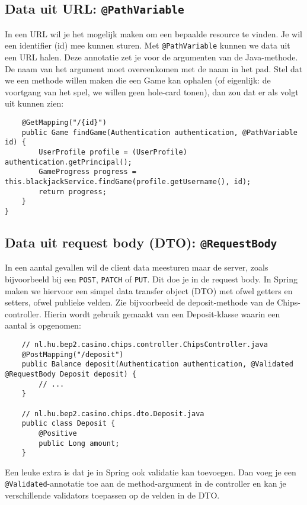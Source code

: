 \subsection{Data uit URL: \texttt{@PathVariable}}
In een URL wil je het mogelijk maken om een bepaalde resource te vinden. 
Je wil een identifier (id) mee kunnen sturen.
Met \texttt{@PathVariable} kunnen we data uit een URL halen. Deze annotatie zet je voor 
de argumenten van de Java-methode. De naam van het argument moet overeenkomen met de naam 
in het pad. Stel dat we een methode willen 
maken die een Game kan ophalen 
(of eigenlijk: de voortgang van het spel, we willen geen hole-card tonen), 
dan zou dat er als volgt uit kunnen zien:
\begin{verbatim}
    @GetMapping("/{id}")
    public Game findGame(Authentication authentication, @PathVariable id) {
        UserProfile profile = (UserProfile) authentication.getPrincipal();
        GameProgress progress = this.blackjackService.findGame(profile.getUsername(), id);
        return progress;
    }
}
\end{verbatim}

\subsection{Data uit request body (DTO): \texttt{@RequestBody}}
In een aantal gevallen wil de client data meesturen maar de server, zoals 
bijvoorbeeld bij een \texttt{POST}, \texttt{PATCH} of \texttt{PUT}. 
Dit doe je in de request body. In Spring maken we hiervoor een simpel
data transfer object (DTO) met ofwel getters en setters, ofwel publieke velden. 
Zie bijvoorbeeld de deposit-methode van de Chips-controller.
Hierin wordt gebruik gemaakt van een Deposit-klasse waarin een aantal is
opgenomen:

\begin{verbatim}
    // nl.hu.bep2.casino.chips.controller.ChipsController.java
    @PostMapping("/deposit")
    public Balance deposit(Authentication authentication, @Validated @RequestBody Deposit deposit) {
        // ...
    }

    // nl.hu.bep2.casino.chips.dto.Deposit.java
    public class Deposit {
        @Positive
        public Long amount;
    }
\end{verbatim}

Een leuke extra is dat je in Spring ook validatie kan toevoegen.
Dan voeg je een \texttt{@Validated}-annotatie toe aan de method-argument in de controller
en kan je verschillende validators toepassen op de velden in de DTO.

